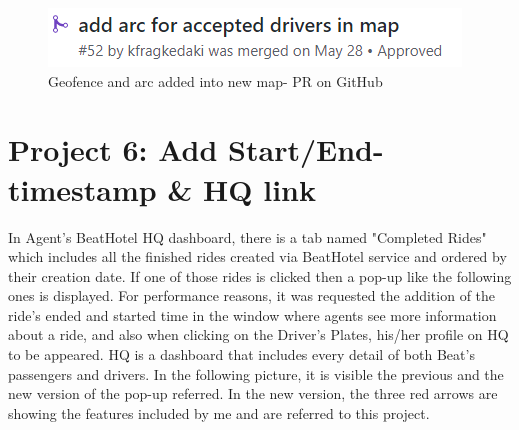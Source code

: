 \begin{figure}[H]
	\begin{center}
		\includegraphics[scale=0.85]{images/my_projects/feature-add-arc-to-arcs-PR.png}
	\end{center}
	\caption{Geofence and arc added into new map- PR on GitHub}
\end{figure}

\section{Project 6: Add Start/End-timestamp \& HQ link}

In Agent's BeatHotel HQ dashboard, there is a tab named "Completed Rides" which includes all the finished rides created via BeatHotel service and ordered by their creation date. If one of those rides is clicked then a pop-up like the following ones is displayed. For performance reasons, it was requested the addition of the ride's ended and started time in the window where agents see more information about a ride, and also when clicking on the Driver's Plates, his/her profile on HQ to be appeared. HQ is a dashboard that includes every detail of both Beat's passengers and drivers. In the following picture, it is visible the previous and the new version of the pop-up referred. In the new version, the three red arrows are showing the features included by me and are referred to this project. \par

